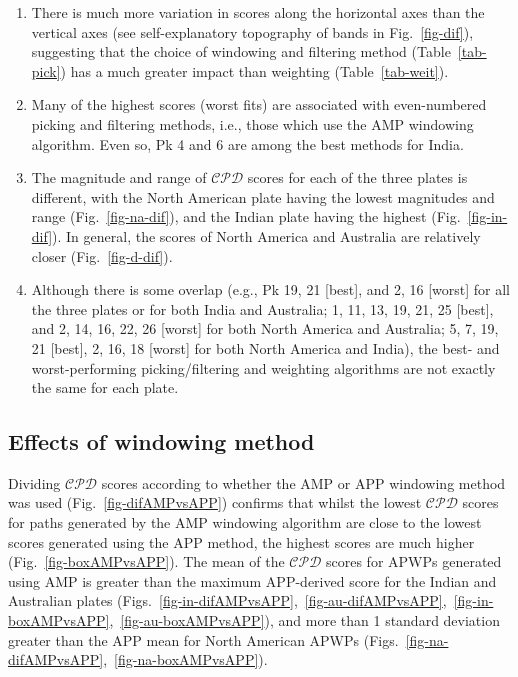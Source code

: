 \begin{enumerate}
  \item There is much more variation in scores along the horizontal axes than
	the vertical axes (see self-explanatory topography of bands in
	Fig.~\ref{fig-dif}), suggesting that the choice of windowing and filtering
	method (Table~\ref{tab-pick}) has a much greater impact than weighting
	(Table~\ref{tab-weit}).
  \item Many of the highest scores (worst fits) are associated with
	even-numbered picking and filtering methods, i.e., those which use the AMP
	windowing algorithm. Even so, Pk 4 and 6 are among the best methods for
	India.
  \item The magnitude and range of $\mathcal{CPD}$ scores for each of the three
	plates is different, with the North American plate having the lowest
	magnitudes and range (Fig.~\ref{fig-na-dif}), and the Indian plate having
	the highest (Fig.~\ref{fig-in-dif}). In general, the scores of North America
	and Australia are relatively closer (Fig.~\ref{fig-d-dif}).
  \item Although there is some overlap (e.g., Pk 19, 21 [best], and
	2, 16 [worst] for all the three plates or for both India and Australia; 1,
	11, 13, 19, 21, 25 [best], and 2, 14, 16, 22, 26 [worst] for both North
	America and Australia; 5, 7, 19, 21 [best], 2, 16, 18 [worst] for both North
	America and India), the best- and worst-performing picking/filtering and
	weighting algorithms are not exactly the same for each plate.
\end{enumerate}

\subsection{Effects of windowing method}

Dividing $\mathcal{CPD}$ scores according to whether the AMP or APP windowing
method was used (Fig.~\ref{fig-difAMPvsAPP}) confirms that whilst the lowest
$\mathcal{CPD}$ scores for paths generated by the AMP windowing algorithm are
close to the lowest scores generated using the APP method, the highest scores
are much higher (Fig.~\ref{fig-boxAMPvsAPP}). The mean of the $\mathcal{CPD}$
scores for APWPs generated using AMP is greater than the maximum APP-derived
score for the Indian and Australian plates
(Figs.~\ref{fig-in-difAMPvsAPP},~\ref{fig-au-difAMPvsAPP},~\ref{fig-in-boxAMPvsAPP},~\ref{fig-au-boxAMPvsAPP}),
and more than 1 standard deviation greater than the APP mean for North American
APWPs (Figs.~\ref{fig-na-difAMPvsAPP},~\ref{fig-na-boxAMPvsAPP}).


